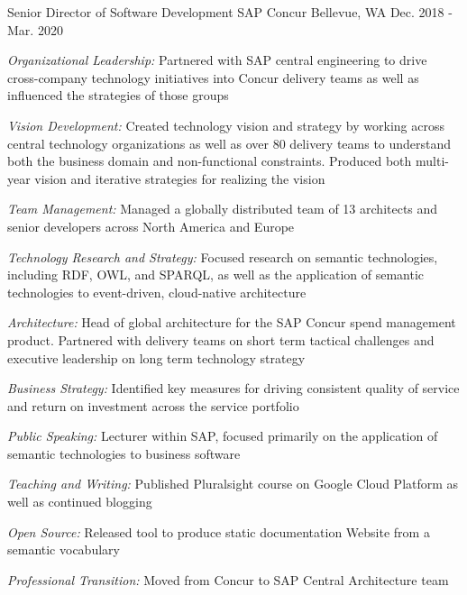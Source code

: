 \begin{cventries}

\cventry
{Senior Director of Software Development} %
{SAP Concur} %
{Bellevue, WA} %
{Dec. 2018 - Mar. 2020} %
{ %
\begin{cvitems}
\item {\emph{Organizational Leadership:} Partnered with SAP central engineering to drive cross-company technology initiatives into Concur delivery teams as well as influenced the strategies of those groups }
\item {\emph{Vision Development:} Created technology vision and strategy by working across central technology organizations as well as over 80 delivery teams to understand both the business domain and non-functional constraints. Produced both multi-year vision and iterative strategies for realizing the vision }
\item {\emph{Team Management:} Managed a globally distributed team of 13 architects and senior developers across North America and Europe }
\item {\emph{Technology Research and Strategy:} Focused research on semantic technologies, including RDF, OWL, and SPARQL, as well as the application of semantic technologies to event-driven, cloud-native architecture }
\item {\emph{Architecture:} Head of global architecture for the SAP Concur spend management product. Partnered with delivery teams on short term tactical challenges and executive leadership on long term technology strategy }
\item {\emph{Business Strategy:} Identified key measures for driving consistent quality of service and return on investment across the service portfolio }
\item {\emph{Public Speaking:} Lecturer within SAP, focused primarily on the application of semantic technologies to business software }
\item {\emph{Teaching and Writing:} Published Pluralsight course on Google Cloud Platform as well as continued blogging }
\item {\emph{Open Source:} Released tool to produce static documentation Website from a semantic vocabulary }
\item {\emph{Professional Transition:} Moved from Concur to SAP Central Architecture team }
\end{cvitems}
}



\end{cventries}
